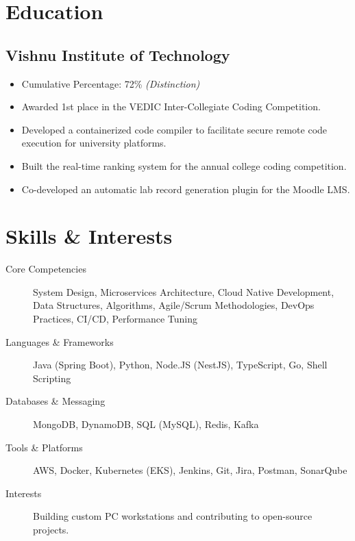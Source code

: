 \documentclass[11pt]{article}
\begin{document}
\section{Education}
\subsection{Vishnu Institute of Technology  }
\begin{itemize}
    \item Cumulative Percentage: 72\% \textit{(Distinction)}
    \item Awarded 1st place in the VEDIC Inter-Collegiate Coding Competition.
    \item Developed a containerized code compiler to facilitate secure remote code execution for university platforms.
    \item Built the real-time ranking system for the annual college coding competition.
    \item Co-developed an automatic lab record generation plugin for the Moodle LMS.
\end{itemize}

\section{Skills \& Interests}
\begin{description}
    \item[Core Competencies] System Design, Microservices Architecture, Cloud Native Development, Data Structures, Algorithms, Agile/Scrum Methodologies, DevOps Practices, CI/CD, Performance Tuning
    \item[Languages \& Frameworks] Java (Spring Boot), Python, Node.JS (NestJS), TypeScript, Go, Shell Scripting
    \item[Databases \& Messaging] MongoDB, DynamoDB, SQL (MySQL), Redis, Kafka
    \item[Tools \& Platforms] AWS, Docker, Kubernetes (EKS), Jenkins, Git, Jira, Postman, SonarQube
    \item[Interests] Building custom PC workstations and contributing to open-source projects.
\end{description}
\end{document}
